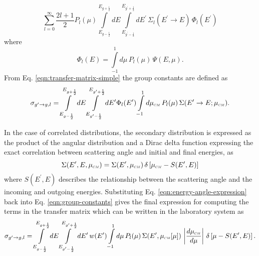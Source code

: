 \begin{equation} \label{eqn:transfer-matrix-simple}
  \sum_{l=0}^{\infty} \dfrac{2l+1}{2}  P_{l}(\mu) \int\limits_{E_{g-\frac{1}{2}}}^{E_{g+\frac{1}{2}}} dE \int\limits_{E_{g^{\prime}-\frac{1}{2}}}^{E_{g^{\prime}+\frac{1}{2}}} dE^{\prime} \, \Sigma_l(E^{\prime}\rightarrow E) \, \Phi_l(E^{\prime})
\end{equation}
where
\begin{equation}
  \Phi_l(E) = \int\limits_{-1}^{1} d\mu \, P_l(\mu) \, \Psi(E,\mu).
\end{equation}
From Eq. \eqref{eqn:transfer-matrix-simple} the group constants are defined as
\begin{equation} \label{eqn:group-constants}
  \sigma_{g^{\prime}\rightarrow g,l} = \int\limits_{E_{g-\frac{1}{2}}}^{E_{g+\frac{1}{2}}} dE \int\limits_{E_{g^{\prime}-\frac{1}{2}}}^{E_{g^{\prime}+\frac{1}{2}}} dE^{\prime} \Phi_l(E^{\prime}) \int\limits_{-1}^{1} d\mucm \, P_l(\mu) \, \Sigma(E^{\prime}\rightarrow E; \mucm).
\end{equation}

In the case of correlated distributions, the secondary distribution is expressed as the product of the angular distribution and a Dirac delta function expressing the exact correlation between scattering angle and initial and final energies, as
\begin{equation} \label{eqn:energy-angle-expression}
  \Sigma(E^{\prime},E,\mucm) = \Sigma(E^{\prime},\mucm) \, \delta\left[\mucm - S(E^{\prime},E)\right]
\end{equation}
where $S(E^{\prime},E)$ describes the relationship between the scattering angle and the incoming and outgoing energies. Substituting Eq. \eqref{eqn:energy-angle-expression} back into Eq. \eqref{eqn:group-constants} gives the final expression for computing the terms in the transfer matrix which can be written in the laboratory system as
\begin{equation} \label{eqn:transfer-constants}
  \sigma_{g^{\prime}\rightarrow g,l} = \int\limits_{E_{g-\frac{1}{2}}}^{E_{g+\frac{1}{2}}} dE \int\limits_{E_{g^{\prime}-\frac{1}{2}}}^{E_{g^{\prime}+\frac{1}{2}}} dE^{\prime} \, w(E^{\prime}) \int\limits_{-1}^{1} d\mu \, P_l(\mu) \, \Sigma(E^{\prime},\mucm[\mu]) \, \left| \dfrac{d\mucm}{d\mu} \right| \, \delta\left[\mu - S(E^{\prime},E)\right].
\end{equation}

